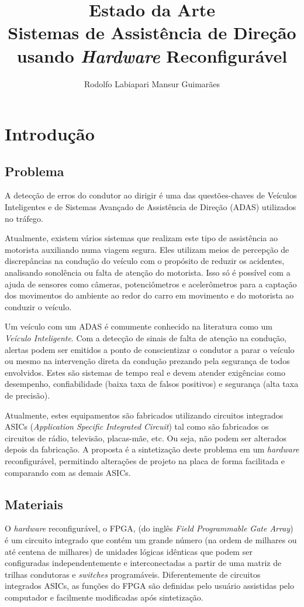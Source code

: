 \documentclass[12pt]{article}
\title{Estado da Arte \\Sistemas de Assistência de Direção usando \textit{Hardware} Reconfigurável}
\author{Rodolfo Labiapari Mansur Guimarães}
\begin{document}
 

\maketitle

\section{Introdução}
\subsection{Problema}
A detecção de erros do condutor ao dirigir é uma das questões-chaves de Veículos Inteligentes e de Sistemas Avançado de Assistência de Direção (ADAS) utilizados no tráfego.

Atualmente, existem vários sistemas que realizam este tipo de assistência ao motorista auxiliando numa viagem segura. Eles utilizam meios de percepção de discrepâncias na condução do veículo com o propósito de reduzir os acidentes, analisando sonolência ou falta de atenção do motorista. Isso só é possível com a ajuda de sensores como câmeras, potenciômetros e acelerômetros para a captação dos movimentos do ambiente ao redor do carro em movimento e do motorista ao conduzir o veículo.

Um veículo com um ADAS é comumente conhecido na literatura como um \textit{Veículo Inteligente}. Com a detecção de sinais de falta de atenção na condução, alertas podem ser emitidos a ponto de conscientizar o condutor a parar o veículo ou mesmo na intervenção direta da condução prezando pela segurança de todos envolvidos. Estes são sistemas de tempo real e devem atender exigências como desempenho, confiabilidade (baixa taxa de falsos positivos) e segurança (alta taxa de precisão).

Atualmente, estes equipamentos são fabricados utilizando circuitos integrados ASICs (\textit{Application Specific Integrated Circuit}) tal como são fabricados os circuitos de rádio, televisão, placas-mãe, etc. Ou seja, não podem ser alterados depois da fabricação. A proposta é a sintetização deste problema em um \textit{hardware} reconfigurável, permitindo alterações de projeto na placa de forma facilitada e comparando com as demais ASICs.

\subsection{Materiais}
O \textit{hardware} reconfigurável, o FPGA, (do inglês \textit{Field Programmable Gate Array}) é um circuito integrado que contém um grande número (na ordem de milhares ou até centena de milhares) de unidades lógicas idênticas que podem ser configuradas independentemente e interconectadas a partir de uma matriz de trilhas condutoras e \textit{switches} programáveis. Diferentemente de circuitos integrados ASICs, as funções do FPGA são definidas pelo usuário assistidas pelo computador e facilmente modificadas após sintetização.
\end{document}
